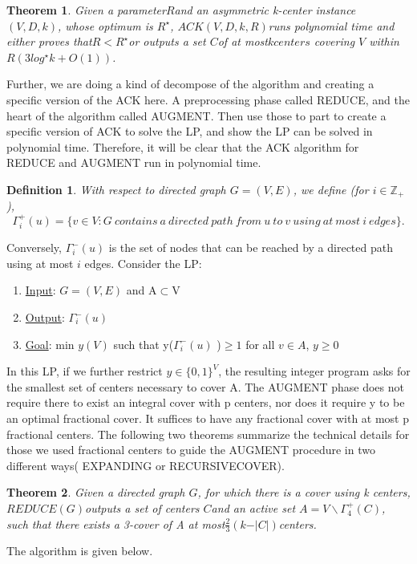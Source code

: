 \documentclass{article}
\newtheorem{theorem}{Theorem}
\newtheorem{definition}{Definition}
\begin{document}
\begin{theorem}
Given a parameter$ R $and an asymmetric k-center instance $(V,D,k)$, whose optimum is $R^\star$, $ACK(V,D,k,R) $runs polynomial time and either proves that$ R<R^\star $or outputs a set $C $of at most$k centers$ covering $V$ within $R(3log^\star k + O(1))$.
\end{theorem}

Further, we are doing a kind of decompose of the algorithm and creating a specific version of the ACK here. A preprocessing phase called REDUCE, and the heart of the algorithm called AUGMENT. Then use those to part to create a specific version of ACK to solve the LP, and show the LP can be solved in polynomial time. Therefore, it will be clear that the ACK algorithm for REDUCE and AUGMENT run in polynomial time.

\begin{definition}
With respect to directed graph $G=(V,E)$, we define (for $i\in \mathbb{Z}_+$),
$$\Gamma_i^+(u)=\{v\in V : G \ contains \ a \ directed\  path\ from\ u\ to\ v\ using\ at\ most\ i\ edges \}.$$
\end{definition}
Conversely, $\Gamma_i^-(u)$ is the set of nodes that can be reached by a directed path using at most $i$ edges. Consider the LP:

\begin{enumerate}
\item \underline{Input}: $G=(V, E)$ and A$\subset$V
\item \underline{Output}: $\Gamma_i^-(u)$
\item \underline{Goal}: min $y(V)$ such that y($\Gamma_i^-(u)$ )$\geq 1$ for all $v \in A$, $y \geq 0$
\end{enumerate}

In this LP, if we further restrict $y\in \{ 0, 1\}^V$, the resulting integer program asks for the smallest set of centers necessary to cover A. The AUGMENT phase does not require there to exist an integral cover with p centers, nor does it require y to be an optimal fractional cover. It suffices to have any fractional cover with at most p fractional centers. The following two theorems summarize the technical details for those we used fractional centers to guide the AUGMENT procedure in two different ways( EXPANDING or RECURSIVECOVER).

\begin{theorem}
Given a directed graph $G$, for which there is a cover using k centers, $REDUCE (G)$outputs a set of centers $C $and an active set $A=V\backslash \Gamma_4^+(C)$, such that there exists a 3-cover of A at most$ \frac23(k-\vert C\vert) $centers.
\end{theorem}
The algorithm is given below.
\end{document}
